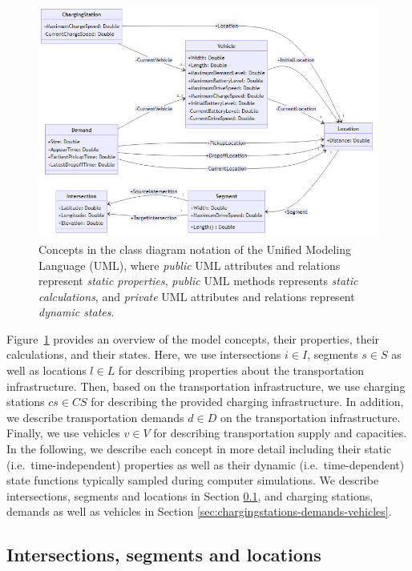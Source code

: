 \documentclass[graybox]{svmult}
\begin{document}
\begin{figure}[htbp]
	\centering
	\includegraphics[width=\textwidth]{../../diagrams/model/classes-v0.1.png}
	\caption{Concepts in the class diagram notation of the Unified Modeling Language (UML), where \textit{public} UML attributes and relations represent \textit{static properties}, \textit{public} UML methods represents \textit{static calculations}, and \textit{private} UML attributes and relations represent \textit{dynamic states}.}
	\label{fig:concepts}
\end{figure}

Figure~\ref{fig:concepts} provides an overview of the model concepts, their properties, their calculations, and their states.
Here, we use intersections $i \in I$, segments $s \in S$ as well as locations $l \in L$ for describing properties about the transportation infrastructure.
Then, based on the transportation infrastructure, we use charging stations $cs \in CS$ for describing the provided charging infrastructure.
In addition, we describe transportation demands $d \in D$ on the transportation infrastructure. 
Finally, we use vehicles $v \in V$ for describing transportation supply and capacities.
In the following, we describe each concept in more detail including their static (i.e.\ time-independent) properties as well as their dynamic (i.e.\ time-dependent) state functions typically sampled during computer simulations.
We describe intersections, segments and locations in Section \ref{sec:intersections-segments}, and charging stations, demands as well as vehicles in Section \ref{sec:chargingstations-demands-vehicles}.

\subsection{Intersections, segments and locations}
\label{sec:intersections-segments}
\end{document}
